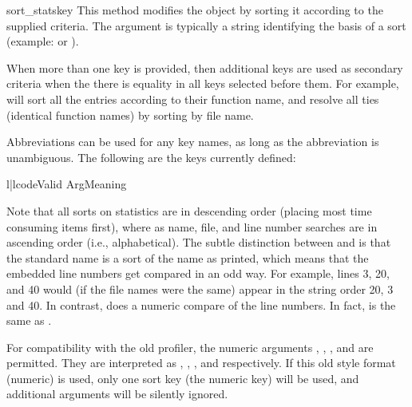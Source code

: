 \begin{methoddesc}[Stats]{sort_stats}{key}
This method modifies the  object by sorting it according
to the supplied criteria.  The argument is typically a string
identifying the basis of a sort (example:  or
).

When more than one key is provided, then additional keys are used as
secondary criteria when the there is equality in all keys selected
before them.  For example,  will sort
all the entries according to their function name, and resolve all ties
(identical function names) by sorting by file name.

Abbreviations can be used for any key names, as long as the
abbreviation is unambiguous.  The following are the keys currently
defined: 

\begin{tableii}{l|l}{code}{Valid Arg}{Meaning}
\end{tableii}

Note that all sorts on statistics are in descending order (placing
most time consuming items first), where as name, file, and line number
searches are in ascending order (i.e., alphabetical). The subtle
distinction between  and  is that the
standard name is a sort of the name as printed, which means that the
embedded line numbers get compared in an odd way.  For example, lines
3, 20, and 40 would (if the file names were the same) appear in the
string order 20, 3 and 40.  In contrast,  does a numeric
compare of the line numbers.  In fact,  is the
same as .

For compatibility with the old profiler, the numeric arguments
, , , and  are permitted.  They are
interpreted as , , , and
 respectively.  If this old style format (numeric)
is used, only one sort key (the numeric key) will be used, and
additional arguments will be silently ignored.
\end{methoddesc}


